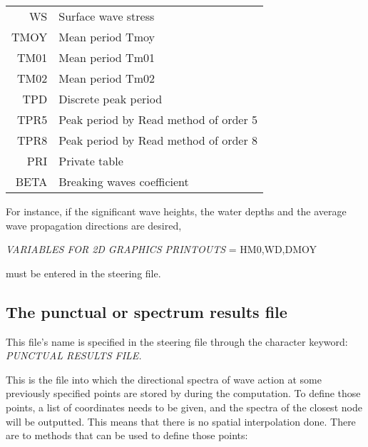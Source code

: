 \begin{longtable}{rl}
WS &  Surface wave stress  \\
TMOY  &  Mean period Tmoy  \\
TM01  &  Mean period Tm01  \\
TM02  &  Mean period Tm02  \\
TPD  &  Discrete peak period  \\
TPR5  &  Peak period by Read method of order 5  \\
TPR8  &  Peak period by Read method of order 8  \\
PRI  &  Private table  \\
BETA &  Breaking waves coefficient \\
%
\end{longtable}


 For instance, if the significant wave heights, the water depths and the average wave propagation directions are desired,

 \textit{VARIABLES FOR 2D GRAPHICS PRINTOUTS }= HM0,WD,DMOY

 must be entered in the steering file.


\subsection{ The punctual or spectrum results file}
\label{se:SpeFile}

This file's name is specified in the steering file through the character keyword: \textit{PUNCTUAL RESULTS FILE.}

This is the file into which the directional spectra of wave action at some previously specified points are stored
by \tomawac during the computation. To define those points, a list of coordinates needs to be given, and the spectra
of the closest node will be outputted. This means that there is no spatial interpolation done. There are to methods
that can be used to define those points:

